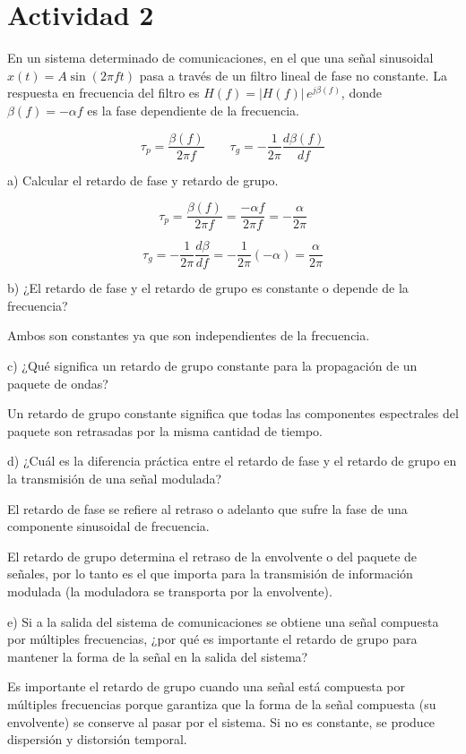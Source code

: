 \section{Actividad 2}

En un sistema determinado de comunicaciones, en el que una señal sinusoidal 
\(x(t)=A\sin(2\pi f t)\) pasa a través de un filtro lineal de fase no constante. 
La respuesta en frecuencia del filtro es 
\(H(f)=|H(f)|\,e^{j\beta(f)}\), 
donde \(\beta(f)=-\alpha f\) es la fase dependiente de la frecuencia.

\[
\tau_{p}=\frac{\beta(f)}{2\pi f}
\qquad
\tau_{g}=-\frac{1}{2\pi}\frac{d\beta(f)}{df}
\]


\noindent a) Calcular el retardo de fase y retardo de grupo.
\bigskip

\[
\tau_p = \frac{\beta(f)}{2\pi f}
       = \frac{-\alpha f}{2\pi f}
       = -\frac{\alpha}{2\pi}
\]

\[
\tau_g=-\frac{1}{2\pi}\frac{d\beta}{df}
      =-\frac{1}{2\pi}(-\alpha)
      =\frac{\alpha}{2\pi}
\]
\bigskip

\noindent b) ¿El retardo de fase y el retardo de grupo es constante o depende de la frecuencia?
\bigskip

Ambos son constantes ya que son independientes de la frecuencia.



\bigskip
\noindent c) ¿Qué significa un retardo de grupo constante para la propagación de un paquete de ondas?
\bigskip

Un retardo de grupo constante significa que todas las componentes espectrales del paquete son retrasadas por la misma cantidad de tiempo.

\bigskip
\noindent d) ¿Cuál es la diferencia práctica entre el retardo de fase y el retardo de grupo en la transmisión de una señal modulada?
\bigskip

El retardo de fase se refiere al retraso o adelanto que sufre la fase de una componente sinusoidal de frecuencia.

El retardo de grupo determina el retraso de la envolvente o del paquete de señales, por lo tanto es el que importa para la transmisión de información modulada (la moduladora se transporta por la envolvente).
\bigskip

\noindent e) Si a la salida del sistema de comunicaciones se obtiene una señal compuesta por múltiples frecuencias, ¿por qué es importante el retardo de grupo para mantener la forma de la señal en la salida del sistema?
\bigskip

Es importante el retardo de grupo cuando una señal está compuesta por múltiples frecuencias porque garantiza que la forma de la señal compuesta (su envolvente) se conserve al pasar por el sistema. Si no es constante, se produce dispersión y distorsión temporal.
